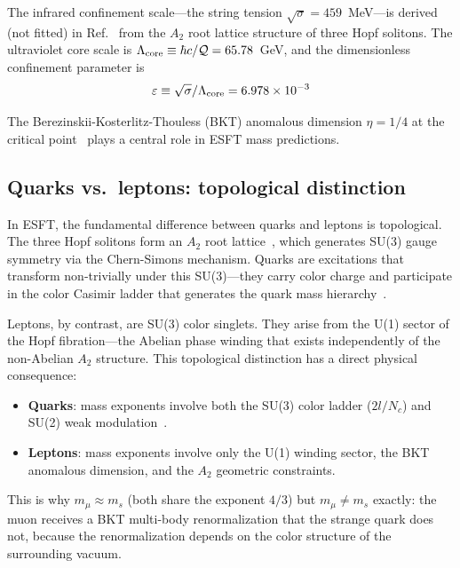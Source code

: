 ﻿\documentclass[twocolumn,preprintnumbers,amsmath,amssymb]{revtex4-2}
\newcommand{\Qoppa}{\mathcal{Q}}
\begin{document}
The infrared confinement scale---the string tension $\sqrt{\sigma} = 459$~MeV---is derived (not fitted) in Ref.~\cite{Paper2} from the $A_2$ root lattice structure of three Hopf solitons. The ultraviolet core scale is $\Lambda_{\rm core} \equiv \hbar c/\Qoppa = 65.78$~GeV, and the dimensionless confinement parameter is
\begin{equation}
\varepsilon \equiv \sqrt{\sigma}/\Lambda_{\rm core} = 6.978 \times 10^{-3}
\label{eq:epsilon}
\end{equation}

The Berezinskii-Kosterlitz-Thouless (BKT) anomalous dimension $\eta = 1/4$ at the critical point~\cite{NK1977,KT1973} plays a central role in ESFT mass predictions.

\subsection{Quarks vs.\ leptons: topological distinction}

In ESFT, the fundamental difference between quarks and leptons is topological. The three Hopf solitons form an $A_2$ root lattice~\cite{Paper2}, which generates SU(3) gauge symmetry via the Chern-Simons mechanism. Quarks are excitations that transform non-trivially under this SU(3)---they carry color charge and participate in the color Casimir ladder that generates the quark mass hierarchy~\cite{Paper7}.

Leptons, by contrast, are SU(3) color singlets. They arise from the U(1) sector of the Hopf fibration---the Abelian phase winding that exists independently of the non-Abelian $A_2$ structure. This topological distinction has a direct physical consequence:

\begin{itemize}
\item \textbf{Quarks}: mass exponents involve both the SU(3) color ladder ($2l/N_c$) and SU(2) weak modulation~\cite{Paper7}.
\item \textbf{Leptons}: mass exponents involve only the U(1) winding sector, the BKT anomalous dimension, and the $A_2$ geometric constraints.
\end{itemize}

This is why $m_\mu \approx m_s$ (both share the exponent $4/3$) but $m_\mu \neq m_s$ exactly: the muon receives a BKT multi-body renormalization that the strange quark does not, because the renormalization depends on the color structure of the surrounding vacuum.

\end{document}
